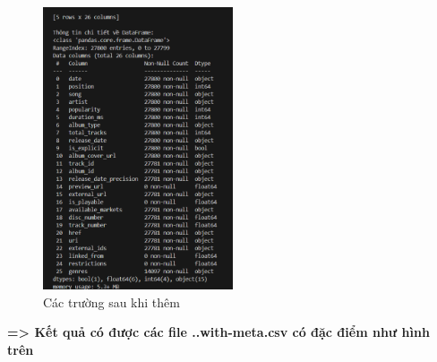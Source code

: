 \begin{figure}[h] %
    \centering %
    \includegraphics[width=0.5\textwidth]{../graphics/data_top50/figure/script/raw_meta/Screenshot 2025-09-30 225603.png} %
    \caption{Các trường sau khi thêm} %
    \label{fig:example} %
\end{figure}

\textbf{=> Kết quả có được các file ..with-meta.csv có đặc điểm như hình trên}

